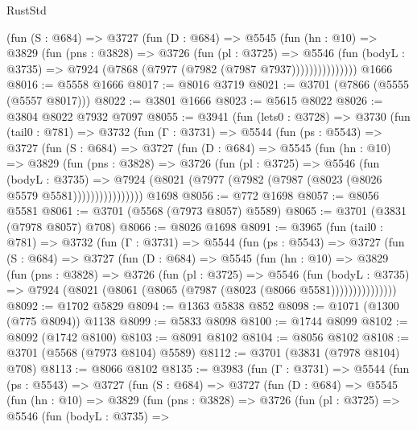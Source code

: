 \begin{lexlean}{RustStd}
\begin{coremodule}
              (fun (S : @684) =>
              @3727
                (fun (D : @684) =>
                @5545
                  (fun (hn : @10) =>
                  @3829
                    (fun (pns : @3828) =>
                    @3726
                      (fun (pl : @3725) =>
                      @5546
                        (fun (bodyL : @3735) =>
                        @7924 (@7868 (@7977 (@7982 (@7987 @7937)))))))))))))))
    @1666
@8016 := @5558 @1666
@8017 := @8016 @3719
@8021 := @3701 (@7866 (@5555 (@5557 @8017)))
@8022 := @3801 @1666
@8023 := @5615 @8022
@8026 := @3804 @8022 @7932 @7097
@8055 := @3941
    (fun (lets0 : @3728) =>
    @3730
      (fun (tail0 : @781) =>
      @3732
        (fun (Γ : @3731) =>
        @5544
          (fun (ps : @5543) =>
          @3727
            (fun (S : @684) =>
            @3727
              (fun (D : @684) =>
              @5545
                (fun (hn : @10) =>
                @3829
                  (fun (pns : @3828) =>
                  @3726
                    (fun (pl : @3725) =>
                    @5546
                      (fun (bodyL : @3735) =>
                      @7924 (@8021 (@7977 (@7982 (@7987 (@8023 (@8026 @5579 @5581))))))))))))))))
    @1698
@8056 := @772 @1698
@8057 := @8056 @5581
@8061 := @3701 (@5568 (@7973 @8057) @5589)
@8065 := @3701 (@3831 (@7978 @8057) @708)
@8066 := @8026 @1698
@8091 := @3965
    (fun (tail0 : @781) =>
    @3732
      (fun (Γ : @3731) =>
      @5544
        (fun (ps : @5543) =>
        @3727
          (fun (S : @684) =>
          @3727
            (fun (D : @684) =>
            @5545
              (fun (hn : @10) =>
              @3829
                (fun (pns : @3828) =>
                @3726
                  (fun (pl : @3725) =>
                  @5546
                    (fun (bodyL : @3735) =>
                    @7924 (@8021 (@8061 (@8065 (@7987 (@8023 (@8066 @5581)))))))))))))))
@8092 := @1702 @5829
@8094 := @1363 @5838 @852
@8098 := @1071 (@1300 (@775 @8094)) @1138
@8099 := @5833 @8098
@8100 := @1744 @8099
@8102 := @8092 (@1742 @8100)
@8103 := @8091 @8102
@8104 := @8056 @8102
@8108 := @3701 (@5568 (@7973 @8104) @5589)
@8112 := @3701 (@3831 (@7978 @8104) @708)
@8113 := @8066 @8102
@8135 := @3983
    (fun (Γ : @3731) =>
    @5544
      (fun (ps : @5543) =>
      @3727
        (fun (S : @684) =>
        @3727
          (fun (D : @684) =>
          @5545
            (fun (hn : @10) =>
            @3829
              (fun (pns : @3828) =>
              @3726
                (fun (pl : @3725) =>
                @5546
                  (fun (bodyL : @3735) =>

\end{coremodule}
\end{lexlean}
